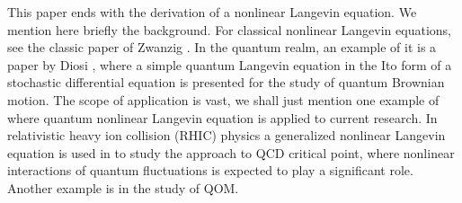 \documentclass[%
amssymb,preprint,preprintnumbers,nofootinbib,superscriptaddress]{revtex4}
\begin{document}
This paper ends with the derivation of a nonlinear Langevin equation. We mention here briefly the background.  For classical nonlinear Langevin equations, see the classic paper of Zwanzig \cite{Zwanzig}. In the quantum realm, an example of it is a paper by Diosi \cite{Diosi}, where a simple quantum Langevin equation in the Ito form of a stochastic differential equation is presented for the study of quantum Brownian motion. The scope of application is vast, we shall just mention one example of where quantum nonlinear Langevin equation is applied to current research. In relativistic heavy ion collision (RHIC) physics  a  generalized nonlinear Langevin equation is used in \cite{JinHu} to study the approach to QCD critical point, where  nonlinear interactions of quantum fluctuations is expected to play a significant role. Another example is in the  study of QOM. 

\vskip 10pt
\end{document}
